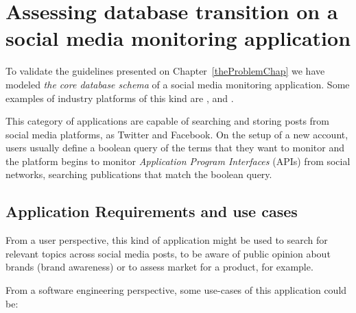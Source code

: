 \section{Assessing database transition on a social media monitoring application}
\label{socmediamonitoringapp}

To validate the guidelines presented on Chapter~\ref{theProblemChap} we have modeled \textit{the core database schema} of a social media monitoring  application. Some examples of industry platforms of this kind are \cite{sproutsocial}, \cite{mention} and \cite{buzzmonitor}. 

This category of applications are capable of searching and storing posts from social media platforms, as Twitter and Facebook. On the setup of a new account, users usually define a boolean query of the terms that they want to monitor and the platform begins to monitor \textit{Application Program Interfaces} (APIs) from social networks, searching publications that match the boolean query. 

\subsection{Application Requirements and use cases}
\label{appoperations}
From a user perspective, this kind of application might be used to search for relevant topics across social media posts, to be aware of public opinion about brands (brand awareness) or to assess market for a product, for example. 

From a software engineering perspective, some use-cases of this application could be:

